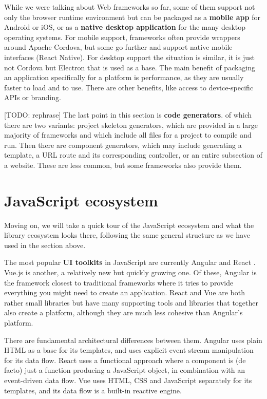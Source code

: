 \documentclass[english,odsaz]{fitthesis}
\begin{document}
While we were talking about Web frameworks so far, some of them support not only
the browser runtime environment but can be packaged as a \textbf{mobile app} for Android
or iOS, or as a \textbf{native desktop application} for the many desktop operating
systems. For mobile support, frameworks often provide wrappers around Apache
Cordova, but some go further and support native mobile interfaces (React
Native). For desktop support the situation is similar, it is just not Cordova
but Electron that is used as a base. The main benefit of packaging an
application specifically for a platform is performance, as they are usually
faster to load and to use. There are other benefits, like access to
device-specific APIs or branding.

[TODO: rephrase] The last point in this section is \textbf{code generators}. of which
there are two variants: project skeleton generators, which are provided in a
large majority of frameworks and which include all files for a project to
compile and run. Then there are component generators, which may include
generating a template, a URL route and its corresponding controller, or an
entire subsection of a website. These are less common, but some frameworks also
provide them.

\section{JavaScript ecosystem}
\label{sec:org43a62a0}
Moving on, we will take a quick tour of the JavaScript ecosystem and what the
library ecosystem looks there, following the same general structure as we have
used in the section above.

The most popular \textbf{UI toolkits} in JavaScript are currently Angular \cite{angular} and
React \cite{react}. Vue.js \cite{vuejs} is another, a relatively new but quickly growing one. Of these,
Angular is the framework closest to traditional frameworks where it tries to
provide everything you might need to create an application. React and Vue are
both rather small libraries but have many supporting tools and libraries that
together also create a platform, although they are much less cohesive than Angular's
platform.

There are fundamental architectural differences between them. Angular uses plain
HTML as a base for its templates, and uses explicit event stream manipulation
for its data flow. React uses a functional approach where a component is (de
facto) just a function producing a JavaScript object, in combination with an
event-driven data flow. Vue uses HTML, CSS and JavaScript separately for its
templates, and its data flow is a built-in reactive engine.
\end{document}
